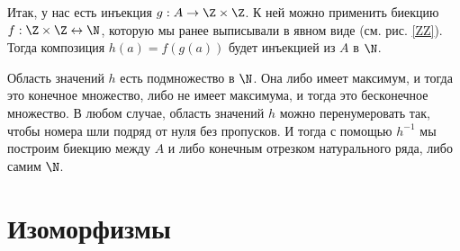 \begin{enumerate}
Итак, у нас есть инъекция $g:A\to\Z\times\Z$. К ней можно применить биекцию $f:\Z\times\Z\leftrightarrow\N$, которую мы ранее выписывали в явном виде (см. рис. \ref{ZZ}). Тогда композиция $h(a)=f(g(a))$ будет инъекцией из $A$ в $\N$.

Область значений $h$ есть подмножество в $\N$. Она либо имеет максимум, и тогда это конечное множество, либо не имеет максимума, и тогда это бесконечное множество. В любом случае, область значений $h$ можно перенумеровать так, чтобы номера шли подряд от нуля без пропусков. И тогда с помощью $h^{-1}$ мы построим биекцию между $A$ и либо конечным отрезком натурального ряда, либо самим $\N$.\epf

\end{enumerate}



\section{Изоморфизмы}



